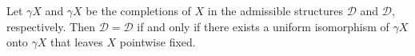 Let $\gamma X$ and $\gamma X$ be the completions of $X$ in the admissible structures $\mathcal{D}$ and $\mathcal{D}$, respectively. Then $\mathcal{D} = \mathcal{D}$ if and only if there exists a uniform isomorphism of $\gamma X$ onto $\gamma X$ that leaves $X$ pointwise fixed.
